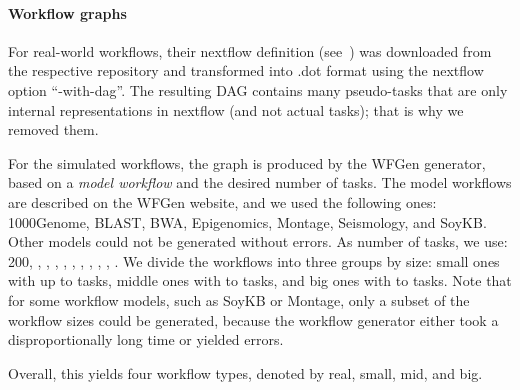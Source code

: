 \documentclass[conference]{IEEEtran}
\begin{document}
    \paragraph{Workflow graphs}
    For real-world workflows, their nextflow definition (see~\cite{ewels2020nf}) was downloaded from the
    respective repository and transformed into .dot format using the nextflow option ``-with-dag''.
    The resulting DAG contains many pseudo-tasks that are only internal representations in nextflow
    (and not actual tasks); that is why we removed them.

    For the simulated workflows, the graph is produced by the WFGen generator, based on a {\em model workflow} and
    the desired number of tasks.
    The model workflows are described on the WFGen website, and we used the following ones:
    1000Genome, BLAST, BWA, Epigenomics, Montage, Seismology, and SoyKB.
    Other models could not be generated without errors.
%
    As number of tasks, we use: 200, , , , , ,
    , , , , .
    We divide the workflows into three groups by size: small ones with up to  tasks, middle
    ones with  to  tasks, and big ones with  to  tasks.
    Note that for some workflow models, such as SoyKB or Montage, only a subset of the workflow sizes could be generated,
    because the workflow generator either took a disproportionally long time or yielded errors.

    Overall, this yields four workflow types, denoted by real, small, mid, and big.
\end{document}
